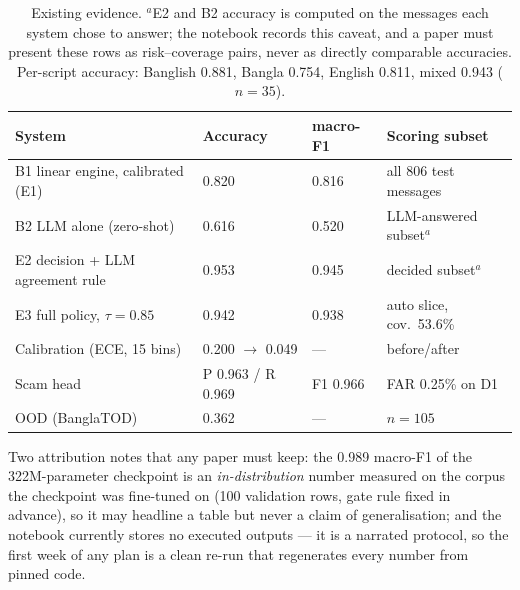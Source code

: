 \documentclass[11pt]{article}
\begin{document}
\begin{table}[htbp]
\centering
\small
\begin{tabular}{@{}llll@{}}
\toprule
System & Accuracy & macro-F1 & Scoring subset \\
\midrule
B1 linear engine, calibrated (E1) & 0.820 & 0.816 & all 806 test messages \\
B2 LLM alone (zero-shot)         & 0.616 & 0.520 & LLM-answered subset$^{a}$ \\
E2 decision + LLM agreement rule & 0.953 & 0.945 & decided subset$^{a}$ \\
E3 full policy, $\tau=0.85$      & 0.942 & 0.938 & auto slice, cov.\ 53.6\% \\
\midrule
Calibration (ECE, 15 bins)       & 0.200 $\rightarrow$ 0.049 & --- & before/after \\
Scam head                        & P 0.963 / R 0.969 & F1 0.966 & FAR 0.25\% on D1 \\
OOD (BanglaTOD)                  & 0.362 & --- & $n=105$ \\
\bottomrule
\end{tabular}
\caption{Existing evidence. $^{a}$E2 and B2 accuracy is computed on the
messages each system chose to answer; the notebook records this caveat, and a
paper must present these rows as risk--coverage pairs, never as directly
comparable accuracies. Per-script accuracy: Banglish 0.881, Bangla 0.754,
English 0.811, mixed 0.943 ($n=35$).}
\label{tab:evidence}
\end{table}

Two attribution notes that any paper must keep: the 0.989 macro-F1 of the
322M-parameter checkpoint is an \emph{in-distribution} number measured on the
corpus the checkpoint was fine-tuned on (100 validation rows, gate rule fixed
in advance), so it may headline a table but never a claim of generalisation;
and the notebook currently stores no executed outputs --- it is a narrated
protocol, so the first week of any plan is a clean re-run that regenerates
every number from pinned code.
\end{document}
